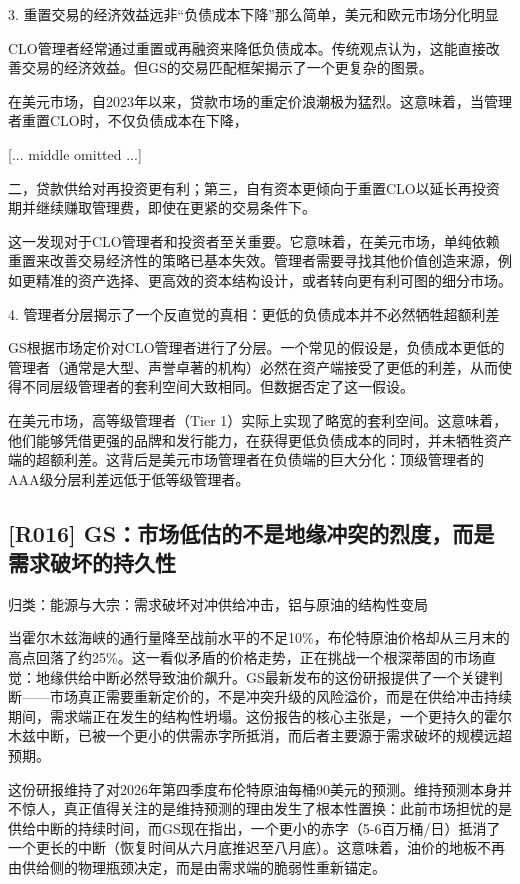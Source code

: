 \documentclass[11pt]{ctexart}
\begin{document}
3. 重置交易的经济效益远非“负债成本下降”那么简单，美元和欧元市场分化明显

CLO管理者经常通过重置或再融资来降低负债成本。传统观点认为，这能直接改善交易的经济效益。但GS的交易匹配框架揭示了一个更复杂的图景。

在美元市场，自2023年以来，贷款市场的重定价浪潮极为猛烈。这意味着，当管理者重置CLO时，不仅负债成本在下降，

[... middle omitted ...]

二，贷款供给对再投资更有利；第三，自有资本更倾向于重置CLO以延长再投资期并继续赚取管理费，即使在更紧的交易条件下。

这一发现对于CLO管理者和投资者至关重要。它意味着，在美元市场，单纯依赖重置来改善交易经济性的策略已基本失效。管理者需要寻找其他价值创造来源，例如更精准的资产选择、更高效的资本结构设计，或者转向更有利可图的细分市场。

4. 管理者分层揭示了一个反直觉的真相：更低的负债成本并不必然牺牲超额利差

GS根据市场定价对CLO管理者进行了分层。一个常见的假设是，负债成本更低的管理者（通常是大型、声誉卓著的机构）必然在资产端接受了更低的利差，从而使得不同层级管理者的套利空间大致相同。但数据否定了这一假设。

在美元市场，高等级管理者（Tier 1）实际上实现了略宽的套利空间。这意味着，他们能够凭借更强的品牌和发行能力，在获得更低负债成本的同时，并未牺牲资产端的超额利差。这背后是美元市场管理者在负债端的巨大分化：顶级管理者的AAA级分层利差远低于低等级管理者。

\subsection{[R016] GS：市场低估的不是地缘冲突的烈度，而是需求破坏的持久性}
{\small\color{refgray}归类：能源与大宗：需求破坏对冲供给冲击，铝与原油的结构性变局}

当霍尔木兹海峡的通行量降至战前水平的不足10\%，布伦特原油价格却从三月末的高点回落了约25\%。这一看似矛盾的价格走势，正在挑战一个根深蒂固的市场直觉：地缘供给中断必然导致油价飙升。GS最新发布的这份研报提供了一个关键判断——市场真正需要重新定价的，不是冲突升级的风险溢价，而是在供给冲击持续期间，需求端正在发生的结构性坍塌。这份报告的核心主张是，一个更持久的霍尔木兹中断，已被一个更小的供需赤字所抵消，而后者主要源于需求破坏的规模远超预期。

这份研报维持了对2026年第四季度布伦特原油每桶90美元的预测。维持预测本身并不惊人，真正值得关注的是维持预测的理由发生了根本性置换：此前市场担忧的是供给中断的持续时间，而GS现在指出，一个更小的赤字（5-6百万桶/日）抵消了一个更长的中断（恢复时间从六月底推迟至八月底）。这意味着，油价的地板不再由供给侧的物理瓶颈决定，而是由需求端的脆弱性重新锚定。
\end{document}
